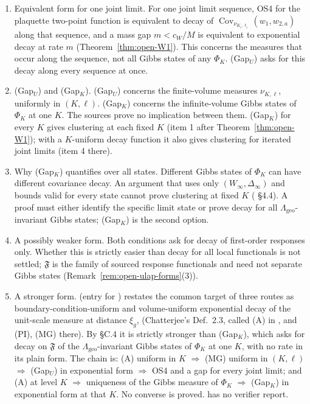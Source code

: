 \begin{remark}\label{rem:open-gap-forms}
\begin{enumerate}
\item Equivalent form for one joint limit. For one joint limit sequence, OS4 for the plaquette two-point function is equivalent to decay of $\operatorname{Cov}_{\nu_{K_i,\ell_i}}(w_1,w_{2,a})$ along that sequence, and a mass gap $m<c_W/M$ is equivalent to exponential decay at rate $m$ (Theorem~\ref{thm:open-W1}). This concerns the measures that occur along the sequence, not all Gibbs states of any $\Phi_K$. (Gap$_U$) asks for this decay along every sequence at once.
\item (Gap$_U$) and (Gap$_K$). (Gap$_U$) concerns the finite-volume measures $\nu_{K,\ell}$, uniformly in $(K,\ell)$. (Gap$_K$) concerns the infinite-volume Gibbs states of $\Phi_K$ at one $K$. The sources prove no implication between them. (Gap$_K$) for every $K$ gives clustering at each fixed $K$ (item 1 after Theorem~\ref{thm:open-W1}); with a $K$-uniform decay function it also gives clustering for iterated joint limits (item 4 there).
\item Why (Gap$_K$) quantifies over all states. Different Gibbs states of $\Phi_K$ can have different covariance decay. An argument that uses only $(W_\infty,\Delta_\infty)$ and bounds valid for every state cannot prove clustering at fixed $K$ ( \S4.4). A proof must either identify the specific limit state or prove decay for all $\Lambda_{\mathrm{geo}}$-invariant Gibbs states; (Gap$_K$) is the second option.
\item A possibly weaker form. Both conditions ask for decay of first-order responses only. Whether this is strictly easier than decay for all local functionals is not settled; $\mathfrak F$ is the family of sourced response functionals and need not separate Gibbs states (Remark~\ref{rem:open-ulap-forms}(3)).
\item A stronger form.  (entry for ) restates the common target of three routes as boundary-condition-uniform and volume-uniform exponential decay of the unit-scale measure at distance $\xi_g$, (Chatterjee's Def.~2.3, called (A) in , and (PI), (MG) there). By  \S C.4 it is strictly stronger than (Gap$_K$), which asks for decay on $\mathfrak F$ of the $\Lambda_{\mathrm{geo}}$-invariant Gibbs states of $\Phi_K$ at one $K$, with no rate in its plain form. The chain is: (A) uniform in $K$ $\Rightarrow$ (MG) uniform in $(K,\ell)$ $\Rightarrow$ (Gap$_U$) in exponential form $\Rightarrow$ OS4 and a gap for every joint limit; and (A) at level $K$ $\Rightarrow$ uniqueness of the Gibbs measure of $\Phi_K$ $\Rightarrow$ (Gap$_K$) in exponential form at that $K$. No converse is proved.  has no verifier report.

\end{enumerate}
\end{remark}
